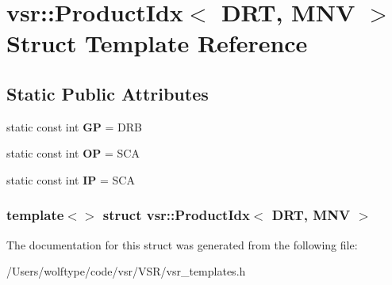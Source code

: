 \hypertarget{structvsr_1_1_product_idx_3_01_d_r_t_00_01_m_n_v_01_4}{\section{vsr\-:\-:Product\-Idx$<$ D\-R\-T, M\-N\-V $>$ Struct Template Reference}
\label{structvsr_1_1_product_idx_3_01_d_r_t_00_01_m_n_v_01_4}
}
\subsection*{Static Public Attributes}
\begin{DoxyCompactItemize}
\item 
\hypertarget{structvsr_1_1_product_idx_3_01_d_r_t_00_01_m_n_v_01_4_a35505e2c67f66ceedcf1952d7cfaf836}{static const int {\bfseries G\-P} = D\-R\-B}\label{structvsr_1_1_product_idx_3_01_d_r_t_00_01_m_n_v_01_4_a35505e2c67f66ceedcf1952d7cfaf836}

\item 
\hypertarget{structvsr_1_1_product_idx_3_01_d_r_t_00_01_m_n_v_01_4_a594d342470b44d13be15aafc647d28ce}{static const int {\bfseries O\-P} = S\-C\-A}\label{structvsr_1_1_product_idx_3_01_d_r_t_00_01_m_n_v_01_4_a594d342470b44d13be15aafc647d28ce}

\item 
\hypertarget{structvsr_1_1_product_idx_3_01_d_r_t_00_01_m_n_v_01_4_ad16c83a52314d11072a696c837ebcec7}{static const int {\bfseries I\-P} = S\-C\-A}\label{structvsr_1_1_product_idx_3_01_d_r_t_00_01_m_n_v_01_4_ad16c83a52314d11072a696c837ebcec7}

\end{DoxyCompactItemize}
\subsubsection*{template$<$$>$ struct vsr\-::\-Product\-Idx$<$ D\-R\-T, M\-N\-V $>$}



The documentation for this struct was generated from the following file\-:\begin{DoxyCompactItemize}
\item 
/\-Users/wolftype/code/vsr/\-V\-S\-R/vsr\-\_\-templates.\-h\end{DoxyCompactItemize}
